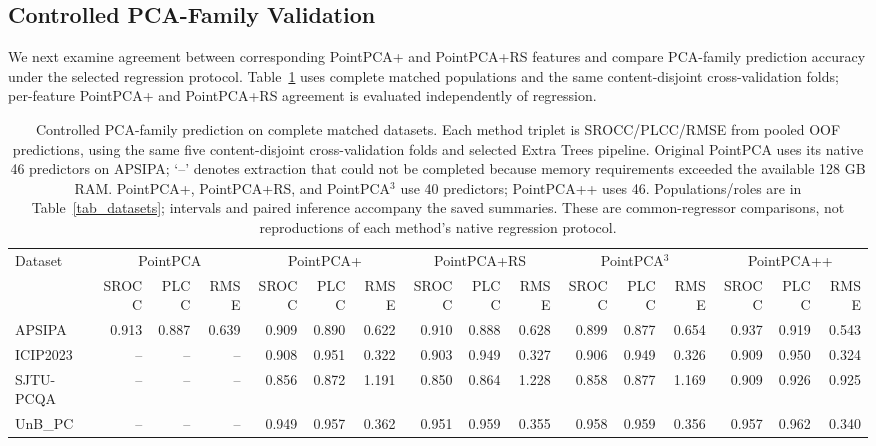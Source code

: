 \documentclass[final,3p,times,twocolumn]{elsarticle}
\begin{document}
\subsection{Controlled PCA-Family Validation} \label{sec_results_pca_family}

We next examine agreement between corresponding PointPCA+ and PointPCA+RS features and compare PCA-family prediction accuracy under the selected regression protocol. Table~\ref{tab_review_pca_family} uses complete matched populations and the same content-disjoint cross-validation folds; per-feature PointPCA+ and PointPCA+RS agreement is evaluated independently of regression.

\begin{table}[t!]
    \centering
    \caption{Controlled PCA-family prediction on complete matched datasets. Each method triplet is SROCC/PLCC/RMSE from pooled OOF predictions, using the same five content-disjoint cross-validation folds and selected Extra Trees pipeline. Original PointPCA uses its native 46 predictors on APSIPA; `--' denotes extraction that could not be completed because memory requirements exceeded the available 128 GB RAM. PointPCA+, PointPCA+RS, and PointPCA$^3$ use 40 predictors; PointPCA++ uses 46. Populations/roles are in Table~\ref{tab_datasets}; intervals and paired inference accompany the saved summaries. These are common-regressor comparisons, not reproductions of each method's native regression protocol.}
    \label{tab_review_pca_family}
    \scriptsize
    \begin{adjustbox}{max width=\textwidth}
        \begin{tabular}{lrrrrrrrrrrrrrrr}
        \toprule
        Dataset & \multicolumn{3}{c}{PointPCA} & \multicolumn{3}{c}{PointPCA+} & \multicolumn{3}{c}{PointPCA+RS} & \multicolumn{3}{c}{PointPCA$^3$} & \multicolumn{3}{c}{PointPCA++} \\
        & SROCC & PLCC & RMSE & SROCC & PLCC & RMSE & SROCC & PLCC & RMSE & SROCC & PLCC & RMSE & SROCC & PLCC & RMSE \\
        \midrule
        APSIPA & 0.913 & 0.887 & 0.639 & 0.909 & 0.890 & 0.622 & 0.910 & 0.888 & 0.628 & 0.899 & 0.877 & 0.654 & 0.937 & 0.919 & 0.543 \\
        ICIP2023 & -- & -- & -- & 0.908 & 0.951 & 0.322 & 0.903 & 0.949 & 0.327 & 0.906 & 0.949 & 0.326 & 0.909 & 0.950 & 0.324 \\
        SJTU-PCQA & -- & -- & -- & 0.856 & 0.872 & 1.191 & 0.850 & 0.864 & 1.228 & 0.858 & 0.877 & 1.169 & 0.909 & 0.926 & 0.925 \\
        UnB\_PC & -- & -- & -- & 0.949 & 0.957 & 0.362 & 0.951 & 0.959 & 0.355 & 0.958 & 0.959 & 0.356 & 0.957 & 0.962 & 0.340 \\
        \bottomrule
        \end{tabular}
    \end{adjustbox}
\end{table}
\end{document}
